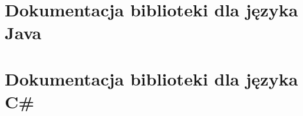 \section{Dokumentacja biblioteki dla języka Java}
 

\section{Dokumentacja biblioteki dla języka C\#}
 


 
